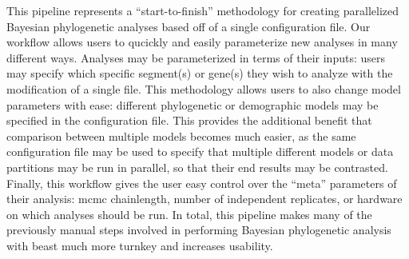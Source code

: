 This pipeline represents a ``start-to-finish'' methodology for creating parallelized Bayesian phylogenetic analyses based off of a single configuration file.
Our workflow allows users to qucickly and easily parameterize new analyses in many different ways.
Analyses may be parameterized in terms of their inputs: users may specify which specific segment(s) or gene(s) they wish to analyze with the modification of a single file.
This methodology allows users to also change model parameters with ease:
different phylogenetic or demographic models may be specified in the configuration file.
This provides the additional benefit that comparison between multiple models becomes much easier, as the same configuration file may be used to specify that multiple different models or data partitions may be run in parallel, so that their end results may be contrasted.
Finally, this workflow gives the user easy control over the ``meta'' parameters of their analysis: \gls{mcmc} chainlength, number of independent replicates, or hardware on which analyses should be run.
In total, this pipeline makes many of the previously manual steps involved in performing Bayesian phylogenetic analysis with \gls{beast} much more turnkey and increases usability.

\cleardoublepage

